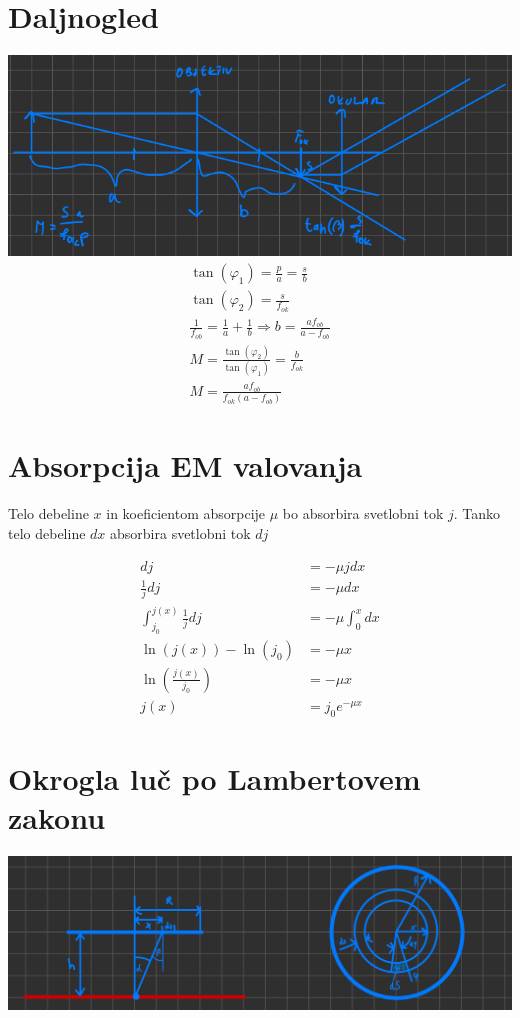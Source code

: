 \documentclass[a4paper,12pt]{article}
\begin{document}
\section{Daljnogled}\label{sec:daljnogled}
\includegraphics[width=\textwidth]{daljnogled.png}
\begin{align}
    \tan(\varphi_1) = \frac{p}{a} = \frac{s}{b}\\
    \tan(\varphi_2) = \frac{s}{f_{ok}} \\
    \frac{1}{f_{ob}} = \frac{1}{a} + \frac{1}{b} \Rightarrow b = \frac{a f_{ob}}{a - f_{ob}} \\
    M = \frac{\tan(\varphi_2)}{\tan(\varphi_1)} = \frac{b}{f_{ok}} \\
    M = \frac{a f_{ob}}{f_{ok} (a - f_{ob})} 
\end{align}

\newpage
\section{Absorpcija EM valovanja}
Telo debeline $x$ in koeficientom absorpcije $\mu$ bo absorbira svetlobni tok $j$. 
Tanko telo debeline $dx$ absorbira svetlobni tok $dj$

\begin{align}
    dj & = -\mu j dx \\
    \frac{1}{j} dj & = -\mu dx \\
    \int_{j_0}^{j(x)} \frac{1}{j} dj & = -\mu \int_{0}^{x} dx \\
    \ln(j(x)) - \ln(j_0) & = -\mu x \\
    \ln\left(\frac{j(x)}{j_0}\right) & = -\mu x \\
    j(x) & = j_0 e^{-\mu x}
\end{align}

\section{Okrogla luč po Lambertovem zakonu}
\includegraphics[width=\textwidth]{lambertova_luc.png}
\end{document}
